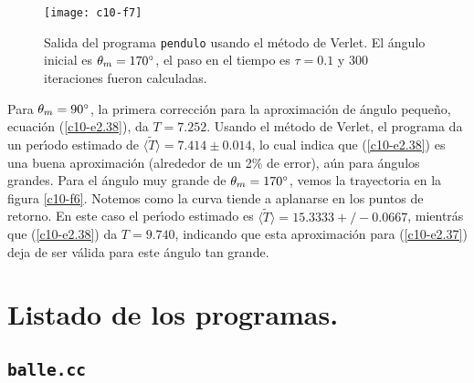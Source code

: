 \begin{figure}[!h]
\begin{center}
\texttt{[image: c10-f7]}
\caption{Salida del programa {\tt pendulo} usando el m{\'e}todo de
  Verlet. El {\'a}ngulo inicial es $\theta_m=170^\circ$, el paso en el tiempo es
  $\tau=0.1$ y 300 iteraciones fueron calculadas.}\label{c10-f7}
\end{center}
\end{figure}

Para $\theta_m=90^\circ$, la primera correcci{\'o}n para la aproximaci{\'o}n de
{\'a}ngulo peque{\~n}o, ecuaci{\'o}n (\ref{c10-e2.38}), da $T=7.252$. Usando el
m{\'e}todo de Verlet, el programa da un per{\'\i}odo estimado de
$\langle\tilde{T}\rangle=7.414\pm 0.014$, lo cual indica que (\ref{c10-e2.38}) es
una buena aproximaci{\'o}n (alrededor de un 2\% de error), a{\'u}n para {\'a}ngulos
grandes. Para el {\'a}ngulo muy grande de $\theta_m=170^\circ$, vemos la
trayectoria en la figura \ref{c10-f6}. Notemos como la curva tiende a
aplanarse en los puntos de retorno. En este caso el per{\'\i}odo estimado
es $\langle\tilde{T}\rangle=15.3333+/-0.0667$, mientr{\'a}s que (\ref{c10-e2.38}) da
$T=9.740$, indicando que esta aproximaci{\'o}n para (\ref{c10-e2.37}) deja
de ser v{\'a}lida para este {\'a}ngulo tan grande.  


\section{Listado de los  programas.}

\subsection{\tt balle.cc}

